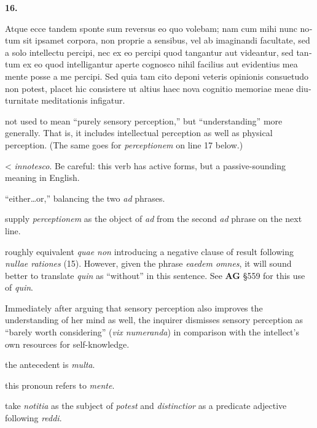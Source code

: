 \beginnumbering
\pstart
    \textbf{16.} \begin{latin}Atque ecce tandem sponte sum reversus eo quo volebam; nam cum mihi nunc notum sit ipsamet corpora, non proprie a sensibus, vel ab imaginandi facultate, sed a solo intellectu percipi, nec ex eo percipi quod tangantur aut videantur, sed tantum ex eo quod intelligantur aperte cognosco nihil facilius aut evidentius mea mente posse a me percipi. Sed quia tam cito deponi veteris opinionis consuetudo non potest, placet hic consistere ut altius haec nova cognitio memoriae meae diuturnitate meditationis infigatur.\end{latin}
\pend
\endnumbering

\prenotes

 not used to mean ``purely sensory perception,'' but ``understanding'' more generally. That is, it includes intellectual perception as well as physical perception. (The same goes for \textit{perceptionem} on line 17 below.)

 < \textit{innotesco}. Be careful: this verb has active forms, but a passive-sounding meaning in English.

 ``either\dots or,'' balancing the two \textit{ad} phrases.

 supply \textit{perceptionem} as the object of \textit{ad} from the second \textit{ad} phrase on the next line.

 roughly equivalent \textit{quae non} introducing a negative clause of result following \textit{nullae rationes} (15). However, given the phrase \textit{eaedem omnes}, it will sound better to translate \textit{quin} as ``without'' in this sentence. See \textbf{AG} §559 for this use of \textit{quin}.

 Immediately after arguing that sensory perception also improves the understanding of her mind as well, the inquirer dismisses sensory perception as ``barely worth considering'' (\textit{vix numeranda}) in comparison with the intellect's own resources for self-knowledge.

 the antecedent is \textit{multa}.

 this pronoun refers to \textit{mente}.

 take \textit{notitia} as the subject of \textit{potest} and \textit{distinctior} as a predicate adjective following \textit{reddi}.

